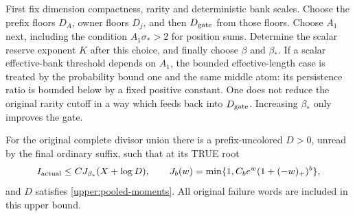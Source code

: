 \begin{remark}
\label{upper:constant-order}
First fix dimension compactness, rarity and deterministic bank scales.
Choose the prefix floors $D_A$, owner floors $D_j$, and then
$D_{\rm gate}$ from those floors.  Choose $A_1$ next, including the
condition $A_1\sigma_*>2$ for position sums.  Determine the scalar
reserve exponent $K$ after this choice, and finally choose $\beta$
and $\beta_*$.  If a scalar effective-bank threshold depends on $A_1$,
the bounded effective-length case is treated by the probability bound
one and the same middle atom: its persistence ratio is bounded below
by a fixed positive constant.  One does not reduce the original rarity
cutoff in a way which feeds back into $D_{\rm gate}$.  Increasing
$\beta_*$ only improves the gate.
\end{remark}

\begin{theorem}
\label{upper:actual-profile}
For the original complete divisor union there is a prefix-uncolored
$D>0$, unread by the final ordinary suffix, such that at its TRUE root
\begin{equation}
 I_{\rm actual}\leq C J_{\beta_*}(X+\log D),\qquad
 J_b(w)=\min\{1,C_b e^w(1+(-w)_+)^b\},
 \label{upper:actual-profile-bound}
\end{equation}
and $D$ satisfies \eqref{upper:pooled-moments}.  All original failure
words are included in this upper bound.
\end{theorem}

